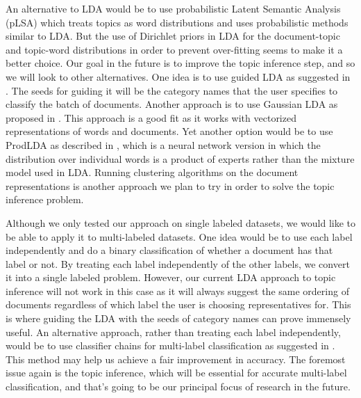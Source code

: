 An alternative to LDA would be to use probabilistic Latent Semantic Analysis (pLSA) which treats topics as word distributions and uses probabilistic methods similar to LDA. But the use of Dirichlet priors in LDA for the document-topic and topic-word distributions in order to prevent over-fitting seems to make it a better choice. Our goal in the future is to improve the topic inference step, and so we will look to other alternatives. One idea is to use guided LDA as suggested in \citep{conf/eacl/JagarlamudiDU12}.  The seeds for guiding it will be the category names that the user specifies to classify the batch of documents.  Another approach is to use Gaussian LDA as proposed in \citep{conf/acl/DasZD15}. This approach is a good fit as it works with vectorized representations of words and documents. Yet another option would be to use ProdLDA as described in \citep{2017arXiv170301488S}, which is a neural network version in which the distribution over individual words is a product of experts rather than the mixture model used in LDA. Running clustering algorithms on the document representations is another approach we plan to try in order to solve the topic inference problem.

Although we only tested our approach on single labeled datasets, we would like to be able to apply it to multi-labeled datasets. One idea would be to use each label independently and do a binary classification of whether a document has that label or not. By treating each label independently of the other labels, we convert it into a single labeled problem. However, our current LDA approach to topic inference will not work in this case as it will always suggest the same ordering of documents regardless of which label the user is choosing representatives for. This is where guiding the LDA with the seeds of category names can prove immensely useful. An alternative approach, rather than treating each label independently, would be to use classifier chains for multi-label classification as suggested in \citep{Read2009}. This method may help us achieve a fair improvement in accuracy. The foremost issue again is the topic inference, which will be essential for accurate multi-label classification, and that's going to be our principal focus of research in the future.